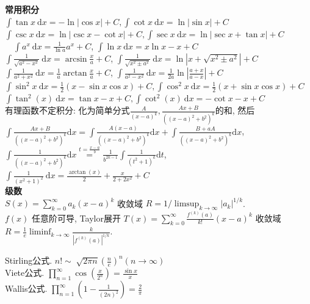 \documentclass[UTF8]{ctexart}
\begin{document}
\noindent \textbf{常用积分}\\
$\int\tan x \mathrm{~d} x=-\ln |\cos x|+C,\int\cot x \mathrm{~d} x=\ln |\sin x|+C $\\
$\int\csc x\mathrm{~d}x=\ln|\csc x-\cot x|+C,\int\sec x \mathrm{~d} x=\ln |\sec x+\tan x|+C $\\
$\quad \int a^{x} \mathrm{~d} x=\frac{1}{\ln a} a^{x}+C $, $\int \ln x \mathrm{~d} x= x \ln x -x +C$\\
$\int \frac{1}{\sqrt{a^2-x^{2}}} \mathrm{~d} x=\arcsin\frac{x}{a}+C $,
$\int \frac{1}{\sqrt{x^{2}\pm a^{2}}} \mathrm{~d} x=\ln \left|x+\sqrt{x^{2}\pm a^{2}}\right|+C$ \\
$\int \frac{1}{a^2+x^{2}} \mathrm{~d} x=\frac{1}{a}\arctan\frac{x}{a}+C $,
$\int \frac{1}{a^2-x^2}\mathrm{~d}x=\frac{1}{2a}\ln|\frac{a+x}{a-x}|+C $\\
$\int \sin ^{2} x \mathrm{~d} x=\frac{1}{2}(x-\sin x \cos x)+C ,\int \cos ^{2} x \mathrm{~d} x=\frac{1}{2}(x+\sin x \cos x)+C$\\
$\int \tan^2(x)\mathrm{~d} x=\tan x-x+C,\int\cot^2(x)\mathrm{~d} x=-\cot x-x+C$ \\
有理函数不定积分: 化为简单分式$\frac{A}{(x-a)^{k}}, \frac{A x+B}{\left((x-a)^{2}+b^{2}\right)^{k}}$的和, 然后
$\int \frac{A x+B}{\left((x-a)^{2}+b^{2}\right)^{k}} \mathrm{d} x 
= \int \frac{A(x-a)}{\left((x-a)^{2}+b^{2}\right)^{k}} \mathrm{d} x
+\int \frac{B+a A}{\left((x-a)^{2}+b^{2}\right)^{k}} \mathrm{d} x $, 
$\int \frac{1}{\left((x-a)^{2}+b^{2}\right)^{k}} \mathrm{d} x \stackrel{t=\frac{x-a}{b}}{=}
\frac{1}{b^{2 k-1}} \int \frac{1}{\left(t^{2}+1\right)^{k}} \mathrm{d} t$, \\
$\int \frac{1}{\left(x^{2}+1\right)^{2}} \mathrm{~d} x=\frac{\arctan(x)}{2}+\frac{x}{2+2x^2}+C$\\

\noindent \textbf{级数}\\
$S(x)=\sum_{k=0}^{\infty} a_k (x-a)^k$ 收敛域 $R = 1/ \limsup_{k\to\infty} |a_k|^{1/k}$. \\
$f(x)$ 任意阶可导, Taylor展开 $T(x)=\sum_{k=0}^{\infty} \frac{f^{(k)}(a)}{k!} (x-a)^k$ 收敛域
$R = \frac1e \liminf_{k\to\infty} \frac{k}{|f^{(k)}(a)|^{1/k}}$.

\noindent Stirling公式. $n!\sim \sqrt[]{2\pi n}\left(\frac{n}{e}\right)^n (n\to\infty )$\\
Viete公式. $\prod_{n=1}^{\infty} \cos (\frac{x}{2^n})=\frac{\sin x}{x} $\\
Wallis公式. $\prod_{n=1}^{\infty} (1-\frac{1}{(2n)^2})=\frac{2}{\pi } $\\
\end{document}
